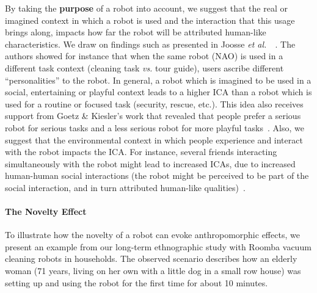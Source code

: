 \documentclass{frontiersSCNS} %
\newcommand{\etal}{{\textit{et al.~}}}
\begin{document}
By taking the \textbf{purpose} of a robot into account, we suggest that the real
or imagined context in which a robot is used and the interaction that this usage
brings along, impacts how far the robot will be attributed human-like
characteristics. We draw on findings such as presented in Joosse
\etal~\cite{joosse_what_2013}. The authors showed for instance that when the
same robot (NAO) is used in a different task context (cleaning task \emph{vs.}
tour guide), users ascribe different ``personalities'' to the robot. In general,
a robot which is imagined to be used in a social, entertaining or playful
context leads to a higher ICA than a robot which is used for a routine or
focused task (security, rescue, etc.). This idea also receives support from
Goetz \& Kiesler's work that revealed that people prefer a serious robot for
serious tasks and a less serious robot for more playful
tasks~\cite{goetz_cooperation_2002, goetz_matching_2003}. Also, we suggest that
the environmental context in which people experience and interact with the robot
impacts the ICA. For instance, several friends interacting simultaneously with
the robot might lead to increased ICAs, due to increased human-human social
interactions (the robot might be perceived to be part of the social interaction,
and in turn attributed human-like qualities)~\cite{baxter2013do}.

\paragraph{The Novelty Effect}
\label{sec:noveltyeffect}

To illustrate how the novelty of a robot can evoke anthropomorphic effects, we
present an example from our long-term ethnographic study with Roomba vacuum
cleaning robots in households. The observed scenario describes how an elderly
woman (71 years, living on her own with a little dog in a small row house) was
setting up and using the robot for the first time for about 10 minutes.
\end{document}
